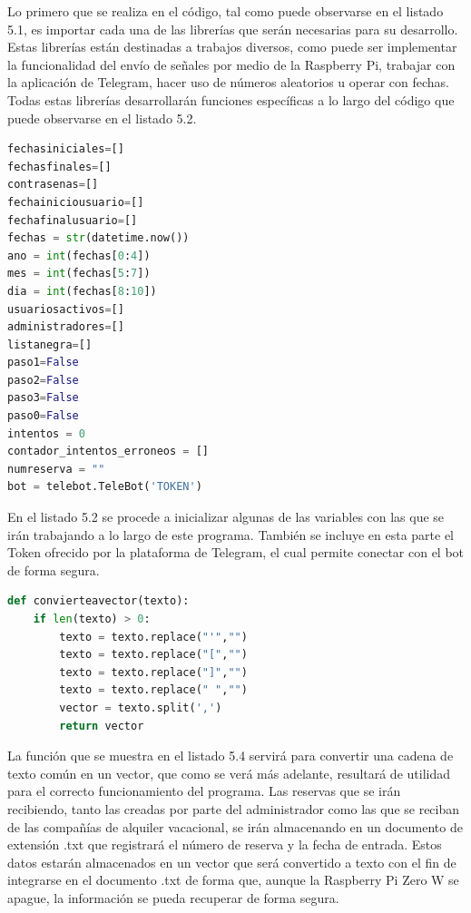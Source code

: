Lo primero que se realiza en el código, tal como puede observarse en el listado 5.1, es importar cada una de las librerías que serán necesarias para su desarrollo. Estas librerías están destinadas a trabajos diversos, como puede ser implementar la funcionalidad del envío de señales por medio de la Raspberry Pi, trabajar con la aplicación de Telegram, hacer uso de números aleatorios u operar con fechas. Todas estas librerías desarrollarán funciones específicas a lo largo del código que puede observarse en el listado 5.2.
\begin{lstlisting}[language=Python,
    caption={Inicializar variables},
    label=src:inicializar-variables
]
fechasiniciales=[]
fechasfinales=[]
contrasenas=[]
fechainiciousuario=[]
fechafinalusuario=[]
fechas = str(datetime.now())
ano = int(fechas[0:4])
mes = int(fechas[5:7])
dia = int(fechas[8:10])
usuariosactivos=[]
administradores=[]
listanegra=[]
paso1=False
paso2=False
paso3=False
paso0=False
intentos = 0 
contador_intentos_erroneos = []
numreserva = ""
bot = telebot.TeleBot('TOKEN')
\end{lstlisting}
En el listado 5.2 se procede a inicializar algunas de las variables con las que se irán trabajando a lo largo de este programa. También se incluye en esta parte el Token ofrecido por la plataforma de Telegram, el cual permite conectar con el bot de forma segura.
\begin{lstlisting}[language=Python,
    caption={Función que convierte el string de reservas en un vector},
    label=src:string-a-vector
]
def convierteavector(texto):
    if len(texto) > 0:
        texto = texto.replace("'","")
        texto = texto.replace("[","")
        texto = texto.replace("]","")
        texto = texto.replace(" ","")
        vector = texto.split(',')
        return vector
\end{lstlisting}
La función que se muestra en el listado 5.4 servirá para convertir una cadena de texto común en un vector, que como se verá más adelante, resultará de utilidad para el correcto funcionamiento del programa. Las reservas que se irán recibiendo, tanto las creadas por parte del administrador como las que se reciban de las compañías de alquiler vacacional, se irán almacenando en un documento de extensión .txt que registrará el número de reserva y la fecha de entrada. Estos datos estarán almacenados en un vector que será convertido a texto con el fin de integrarse en el documento .txt de forma que, aunque la Raspberry Pi Zero W se apague, la información se pueda recuperar de forma segura.
